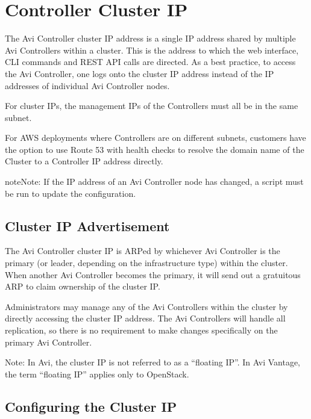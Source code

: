 \documentclass[letterpaper,10pt,english]{sphinxmanual}
\begin{document}
\section{Controller Cluster IP}
\label{\detokenize{getting_started/controller_cluster_ip:controller-cluster-ip}}\label{\detokenize{getting_started/controller_cluster_ip::doc}}
The Avi Controller cluster IP address is a single IP address shared by multiple Avi Controllers within a cluster. This is the address to which the web interface, CLI commands and REST API calls are directed. As a best practice, to access the Avi Controller, one logs onto the cluster IP address instead of the IP addresses of individual Avi Controller nodes.

For cluster IPs, the management IPs of the Controllers must all be in the same subnet.

For AWS deployments where Controllers are on different subnets, customers have the option to use Route 53 with health checks to resolve the domain name of the Cluster to a Controller IP address directly.

\begin{sphinxadmonition}{note}{Note:}
If the IP address of an Avi Controller node has changed, a script must be run to update the configuration.
\end{sphinxadmonition}


\subsection{Cluster IP Advertisement}
\label{\detokenize{getting_started/controller_cluster_ip:cluster-ip-advertisement}}
The Avi Controller cluster IP is ARPed by whichever Avi Controller is the primary (or leader, depending on the infrastructure type) within the cluster. When another Avi Controller becomes the primary, it will send out a gratuitous ARP to claim ownership of the cluster IP.

Administrators may manage any of the Avi Controllers within the cluster by directly accessing the cluster IP address. The Avi Controllers will handle all replication, so there is no requirement to make changes specifically on the primary Avi Controller.

Note: In Avi, the cluster IP is not referred to as a ``floating IP''. In Avi Vantage, the term ``floating IP'' applies only to OpenStack.


\subsection{Configuring the Cluster IP}
\label{\detokenize{getting_started/controller_cluster_ip:configuring-the-cluster-ip}}
\end{document}
